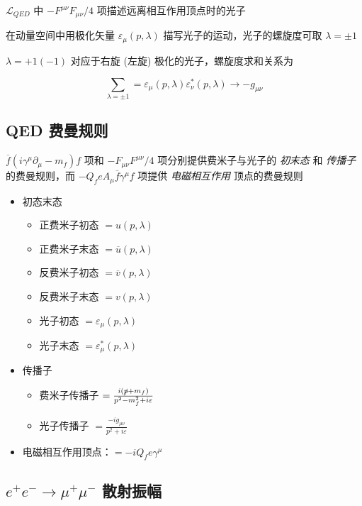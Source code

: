 $\mathcal{L}_{QED}$ 中 $-F^{\mu\nu} F_{\mu\nu}/4$ 项描述远离相互作用顶点时的光子

在动量空间中用极化矢量 $\varepsilon_\mu(p, \lambda)$ 描写光子的运动，光子的螺旋度可取 $\lambda = \pm 1$

$\lambda = +1 (-1)$ 对应于右旋 (左旋) 极化的光子，螺旋度求和关系为

\begin{equation}
    \sum_{\lambda=\pm 1} = \varepsilon_\mu(p, \lambda) \varepsilon^*_\nu(p, \lambda) \to -g_{\mu\nu}
\end{equation}

\subsection{QED 费曼规则}

$\overline{f} (i \gamma^\mu \partial_\mu - m_f) f$ 项和 $-F_{\mu\nu} F^{\mu\nu}/4$ 项分别提供费米子与光子的 \emph{初末态} 和 \emph{传播子} 的费曼规则，而 $-Q_f e A_\mu \overline{f} \gamma^\mu f$ 项提供 \emph{电磁相互作用} 顶点的费曼规则

\begin{itemize}
    \item 初态末态
        \begin{itemize}
            \item 正费米子初态 $=u(p, \lambda)$
            \item 正费米子末态 $=\overline{u}(p, \lambda)$
            \item 反费米子初态 $=\overline{v}(p, \lambda)$
            \item 反费米子末态 $=v(p, \lambda)$
            \item 光子初态 $=\varepsilon_\mu(p, \lambda)$
            \item 光子末态 $=\varepsilon^*_\mu(p, \lambda)$
        \end{itemize}
    \item 传播子
        \begin{itemize}
            \item 费米子传播子 $=\frac{i(\slashed{p} + m_f)}{p^2 - m_f^2 + i\varepsilon}$
            \item 光子传播子 $=\frac{-i g_{\mu\nu}}{p^2 + i\varepsilon}$
        \end{itemize}
    \item 电磁相互作用顶点：$=-i Q_f e \gamma^\mu$
\end{itemize}

\subsection{\texorpdfstring{$e^+ e^- \to \mu^+ \mu^-$}{e+e- -> mu+mu-} 散射振幅}

